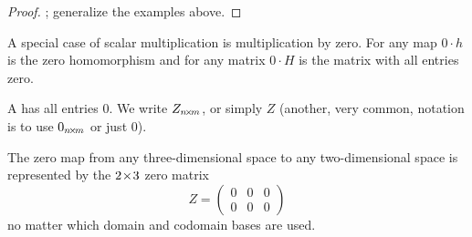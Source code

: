 \begin{proof}
; generalize the examples above.
\end{proof}

A special case of scalar multiplication is multiplication by zero.
For any map $0\cdot h$ is the zero homomorphism and for any matrix
$0\cdot H$ is the matrix with all entries zero.

\begin{definition}
A %
has all entries $0$.
We write $Z_{n \! \times \! m}$, or simply $Z$
(another, very common, notation is to use $0_{n \! \times \! m}$ or just $0$).
\end{definition}

\begin{example}
The zero map from any three-dimensional space to any two-dimensional space
is represented by the \( 2 \! \times \! 3 \) zero matrix
\begin{equation*}
   Z=\begin{pmatrix}
     0  &0  &0  \\
     0  &0  &0
   \end{pmatrix}
\end{equation*}
no matter which domain and codomain bases are used.
\end{example}



